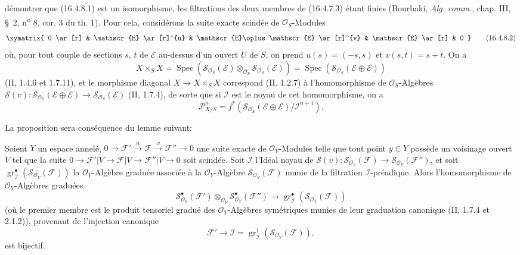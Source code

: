 démontrer que (16.4.8.1) est un isomorphisme, les filtrations des deux membres de
(16.4.7.3) étant finies (Bourbaki, \emph{Alg. comm.}, chap. III, \S~2,
n\textsuperscript{o} 8, cor. 3 du th. 1). Pour cela, considérons la suite exacte
scindée de $\mathcal{O}_S$-Modules
\[
  \xymatrix{
    0 \ar[r] & \mathscr{E} \ar[r]^{u} &
    \mathscr{E}\oplus\mathscr{E} \ar[r]^{v} &
    \mathscr{E} \ar[r] & 0
  }
  \tag{16.4.8.2}
  \label{IV.16.4.8.2}
\]
où, pour tout couple de sections $s$, $t$ de $\mathscr{E}$ au-dessus d'un ouvert
$U$ de $S$, on prend $u(s)=(-s,s)$ et $v(s,t)=s+t$. On a
\[
  X\times_S X=\operatorname{Spec}
  (\mathscr{S}_{\mathcal{O}_S}(\mathscr{E})\otimes_{\mathcal{O}_S}
  \mathscr{S}_{\mathcal{O}_S}(\mathscr{E}))
  =\operatorname{Spec}(\mathscr{S}_{\mathcal{O}_S}
  (\mathscr{E}\oplus\mathscr{E}))
\]
(II, 1.4.6 et 1.7.11), et le morphisme diagonal $X\to X\times_S X$ correspond
(II, 1.2.7) à l'homomorphisme de $\mathcal{O}_S$-Algèbres
$\mathscr{S}(v):\mathscr{S}_{\mathcal{O}_S}(\mathscr{E}\oplus\mathscr{E})
\to\mathscr{S}_{\mathcal{O}_S}(\mathscr{E})$ (II, 1.7.4), de sorte que si
$\mathscr{I}$ est le noyau de cet homomorphisme, on a
\[
  \mathscr{P}_{X/S}^n=f^*(\mathscr{S}_{\mathcal{O}_S}
  (\mathscr{E}\oplus\mathscr{E})/\mathscr{I}^{n+1}).
\]

La proposition sera conséquence du lemme suivant:

\begin{lemma}[16.4.8.3]
\label{IV.16.4.8.3}
Soient $Y$ un espace annelé,
$0\to\mathscr{F}'\xrightarrow{u}\mathscr{F}\xrightarrow{v}\mathscr{F}''\to0$
une suite exacte de $\mathcal{O}_Y$-Modules telle que tout point $y\in Y$
possède un voisinage ouvert $V$ tel que la suite
$0\to\mathscr{F}'|V\to\mathscr{F}|V\to\mathscr{F}''|V\to0$ soit scindée.
Soit $\mathscr{I}$ l'Idéal noyau de
$\mathscr{S}(v):\mathscr{S}_{\mathcal{O}_Y}(\mathscr{F})\to
\mathscr{S}_{\mathcal{O}_Y}(\mathscr{F}'')$, et soit
$\operatorname{gr}_{\mathscr{I}}^\bullet
(\mathscr{S}_{\mathcal{O}_Y}(\mathscr{F}))$ la $\mathcal{O}_Y$-Algèbre graduée
associée à la $\mathcal{O}_Y$-Algèbre
$\mathscr{S}_{\mathcal{O}_Y}(\mathscr{F})$ munie de la filtration
$\mathscr{I}$-préadique. Alors l'homomorphisme de $\mathcal{O}_Y$-Algèbres
graduées
\[
  \mathscr{S}_{\mathcal{O}_Y}^{\bullet}(\mathscr{F}')
  \otimes_{\mathcal{O}_Y}
  \mathscr{S}_{\mathcal{O}_Y}^{\bullet}(\mathscr{F}'')
  \longrightarrow
  \operatorname{gr}_{\mathscr{I}}^\bullet
  (\mathscr{S}_{\mathcal{O}_Y}(\mathscr{F}))
  \tag{16.4.8.4}
  \label{IV.16.4.8.4}
\]
(où le premier membre est le produit tensoriel gradué des
$\mathcal{O}_Y$-Algèbres symétriques munies de leur graduation canonique
(II, 1.7.4 et 2.1.2)), provenant de l'injection canonique
\[
  \mathscr{F}'\longrightarrow\mathscr{I}
  =\operatorname{gr}_{\mathscr{I}}^1
  (\mathscr{S}_{\mathcal{O}_Y}(\mathscr{F})),
\]
est bijectif.
\end{lemma}

